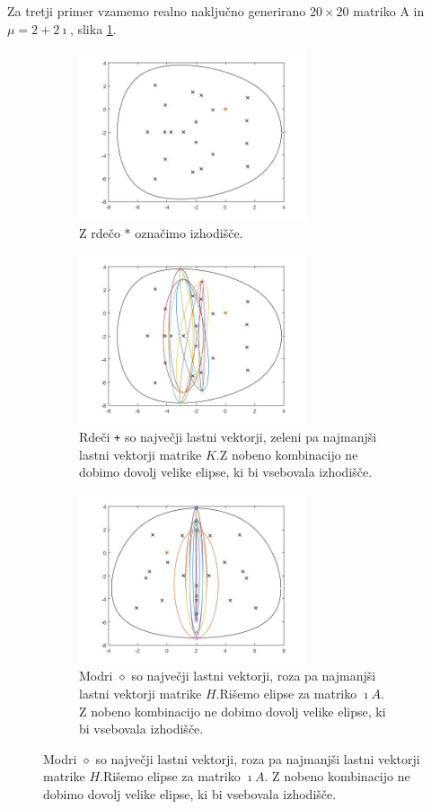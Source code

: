 \documentclass[12pt,a4paper]{amsart}
\theoremstyle{definition}
\theoremstyle{plain}
\begin{document}
Za tretji primer vzamemo realno naključno generirano $20\times 20$ matriko A in $\mu = 2 + 2\imath$, slika \ref{fig:p51}.
\begin{figure}[H]
\renewcommand*\thesubfigure{\Alph{subfigure}}
\begin{subfigure}[t]{0.45\textwidth}
\includegraphics[width=0.9\linewidth,height=5cm]{RC3.jpg}
\caption{Z rdečo $\ast$ označimo izhodišče.}
\label{fig:p51}
\end{subfigure}%
\hfill
\begin{subfigure}[t]{0.45\textwidth}
\includegraphics[width=0.9\linewidth,height=5cm]{RC3e1.jpg}
\caption{Rdeči \verb~+~ so največji lastni vektorji, zeleni pa najmanjši lastni vektorji matrike $K$.\footnotemark[\value{footnote}] Z nobeno kombinacijo ne dobimo dovolj velike elipse, ki bi vsebovala izhodišče.}
\label{fig:p52}
\end{subfigure}
\begin{subfigure}[t]{0.45\textwidth}
\includegraphics[width=0.9\linewidth,height=5cm]{RC3e2.jpg}
\caption{Modri $\diamond$ so največji lastni vektorji, roza pa najmanjši lastni vektorji matrike $H$.\footnotemark[\value{footnote}] Rišemo elipse za matriko $\imath A$. Z nobeno kombinacijo ne dobimo dovolj velike elipse, ki bi vsebovala izhodišče.}

\end{subfigure}
\end{figure}
\end{document}

